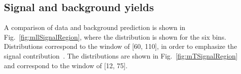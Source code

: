 \subsection{Signal and background yields}\label{subsec:yields}


A comparison of data and background prediction is shown in
Fig.~\ref{fig:mllSignalRegion}, where the \mll{} distribution is shown for the six \pth{} bins. Distributions correspond to the \mt{} window of [60, 110]\GeV, in order to emphasize the signal contribution~\cite{Chatrchyan:2013iaa}. The \mt distributions are shown in Fig.~\ref{fig:mTSignalRegion} and correspond to the \mll window of [12, 75]\GeV.

\begin{figure}[!htbp]
\centering
{}
\end{figure}
